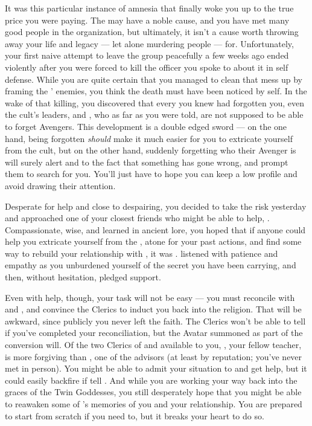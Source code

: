 \documentclass[char]{GL2020}
\begin{document}
It was this particular instance of amnesia that finally woke you up to the true price you were paying. The \pGoaties{} may have a noble cause, and you have met many good people in the organization, but ultimately, it isn't a cause worth throwing away your life and legacy — let alone murdering people — for. Unfortunately, your first naive attempt to leave the group peacefully a few weeks ago ended violently after you were forced to kill the officer you spoke to about it in self defense. While you are quite certain that you managed to clean that mess up by framing the \pGoaties{}’ enemies, you think the death must have been noticed by \cGenesis{} \cGenesis{\them}self. In the wake of that killing, you discovered that every \pGoatie{} you knew had forgotten you, even the cult’s leaders, \cChupSecond{\full} and \cChupLeader{\full}, who as far as you were told, are not supposed to be able to forget Avengers. This development is a double edged sword — on the one hand, being forgotten \emph{should} make it much easier for you to extricate yourself from the cult, but on the other hand, suddenly forgetting who their Avenger is will surely alert \cChupSecond{} and \cChupLeader{} to the fact that something has gone wrong, and prompt them to search for you. You’ll just have to hope you can keep a low profile and avoid drawing their attention.

Desperate for help and close to despairing, you decided to take the risk yesterday and approached one of your closest friends who might be able to help, \cLibrarian{\full}. Compassionate, wise, and learned in ancient lore, you hoped that if anyone could help you extricate yourself from the \pGoaties{}, atone for your past actions, and find some way to rebuild your relationship with \cHeadScientist{}, it was \cLibrarian{\them}. \cLibrarian{} listened with patience and empathy as you unburdened yourself of the secret you have been carrying, and then, without hesitation, pledged \cLibrarian{\their} support.

Even with help, though, your task will not be easy — you must reconcile with \cEbb{} and \cFlow{}, and convince the Clerics to induct you back into the religion. That will be awkward, since publicly you never left the faith. The Clerics won't be able to tell if you've completed your reconciliation, but the Avatar summoned as part of the conversion will. Of the two Clerics of \cEbb{} and \cFlow{} available to you, \cFlowPriest{\full}, your fellow teacher, is more forgiving than \cEbbPriest{\full}, one of the advisors (at least by reputation; you've never met \cEbbPriest{} in person). You might be able to admit your situation to \cFlowPriest{} and get \cFlowPriest{\their} help, but it could easily backfire if \cFlowPriest{\they} tell\cFlowPriest{\verbs} \cEbbPriest{}. And while you are working your way back into the graces of the Twin Goddesses, you still desperately hope that you might be able to reawaken some of \cHeadScientist{}’s memories of you and your relationship. You are prepared to start from scratch if you need to, but it breaks your heart to do so.
\end{document}
